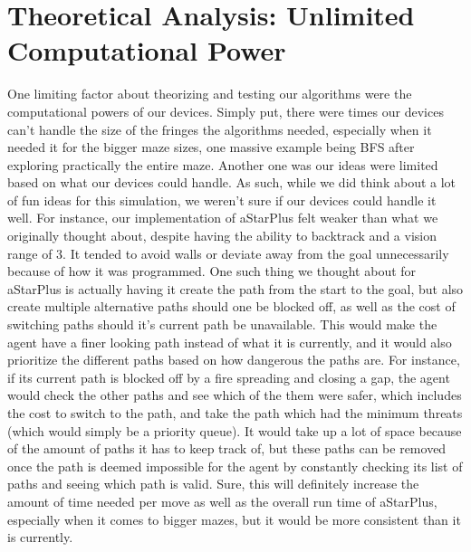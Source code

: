 \documentclass[11pt]{article}
\begin{document}
\section{Theoretical Analysis: Unlimited Computational Power}
One limiting factor about theorizing and testing our algorithms were the computational powers of our devices. Simply put, there were times our devices can't handle the size of the fringes the algorithms needed, especially when it needed it for the bigger maze sizes, one massive example being BFS after exploring practically the entire maze. Another one was our ideas were limited based on what our devices could handle. As such, while we did think about a lot of fun ideas for this simulation, we weren't sure if our devices could handle it well. For instance, our implementation of aStarPlus felt weaker than what we originally thought about, despite having the ability to backtrack and a vision range of 3. It tended to avoid walls or deviate away from the goal unnecessarily because of how it was programmed.
One such thing we thought about for aStarPlus is actually having it create the path from the start to the goal, but also create multiple alternative paths should one be blocked off, as well as the cost of switching paths should it's current path be unavailable. This would make the agent have a finer looking path instead of what it is currently, and it would also prioritize the different paths based on how dangerous the paths are. For instance, if its current path is blocked off by a fire spreading and closing a gap, the agent would check the other paths and see which of the them were safer, which includes the cost to switch to the path, and take the path which had the minimum threats (which would simply be a priority queue). It would take up a lot of space because of the amount of paths it has to keep track of, but these paths can be removed once the path is deemed impossible for the agent by constantly checking its list of paths and seeing which path is valid. Sure, this will definitely increase the amount of time needed per move as well as the overall run time of aStarPlus, especially when it comes to bigger mazes, but it would be more consistent than it is currently.
\end{document}
